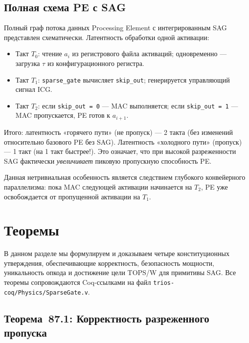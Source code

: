 \subsection{Полная схема PE с SAG}
\label{ssec:glava87-pe-full}

Полный граф потока данных Processing Element с интегрированным
SAG представлен схематически.  Латентность обработки одной активации:
\begin{itemize}
  \item Такт $T_0$: чтение $a_i$ из регистрового файла активаций;
        одновременно — загрузка $\tau$ из конфигурационного регистра.
  \item Такт $T_1$: \texttt{sparse\_gate} вычисляет \texttt{skip\_out};
        генерируется управляющий сигнал ICG.
  \item Такт $T_2$: если \texttt{skip\_out = 0} — MAC выполняется;
        если \texttt{skip\_out = 1} — MAC пропускается, PE готов
        к $a_{i+1}$.
\end{itemize}

Итого: латентность «горячего пути» (не пропуск) — 2 такта
(без изменений относительно базового PE без SAG).
Латентность «холодного пути» (пропуск) — 1 такт (на 1 такт быстрее!).
Это означает, что при высокой разреженности SAG фактически
\emph{увеличивает} пиковую пропускную способность PE.

Данная нетривиальная особенность является следствием глубокого
конвейерного параллелизма: пока MAC следующей активации начинается
на $T_2$, PE уже освобождается от пропущенной активации на $T_1$.

\section{Теоремы}
\label{sec:glava87-theorems}

В данном разделе мы формулируем и доказываем четыре конституционных
утверждения, обеспечивающие корректность, безопасность мощности,
уникальность опкода и достижение цели TOPS/W для примитивы SAG.
Все теоремы сопровождаются Coq-ссылками на файл
\texttt{trios-coq/Physics/SparseGate.v}.


\subsection{Теорема~87.1: Корректность разреженного пропуска}
\label{ssec:thm87-1}

